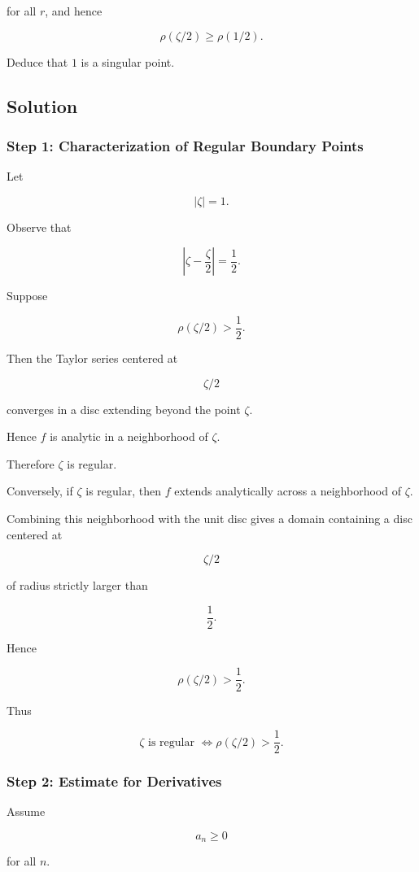 \documentclass[12pt,a4paper]{article}
\theoremstyle{notespace}
\begin{document}
for all \(r\), and hence

\[
\rho(\zeta/2)\ge\rho(1/2).
\]

Deduce that \(1\) is a singular point.

\subsection*{Solution}

\subsubsection*{Step 1: Characterization of Regular Boundary Points}

Let

\[
|\zeta|=1.
\]

Observe that

\[
\left|
\zeta-\frac{\zeta}{2}
\right|
=
\frac12.
\]

Suppose

\[
\rho(\zeta/2)>\frac12.
\]

Then the Taylor series centered at

\[
\zeta/2
\]

converges in a disc extending beyond the point \(\zeta\).

Hence \(f\) is analytic in a neighborhood of \(\zeta\).

Therefore \(\zeta\) is regular.

Conversely, if \(\zeta\) is regular, then \(f\) extends analytically across a neighborhood of \(\zeta\).

Combining this neighborhood with the unit disc gives a domain containing a disc centered at

\[
\zeta/2
\]

of radius strictly larger than

\[
\frac12.
\]

Hence

\[
\rho(\zeta/2)>\frac12.
\]

Thus

\[
\boxed{
	\zeta
	\text{ is regular }
	\Longleftrightarrow
	\rho(\zeta/2)>\frac12.
}
\]

\subsubsection*{Step 2: Estimate for Derivatives}

Assume

\[
a_n\ge0
\]

for all \(n\).
\end{document}
